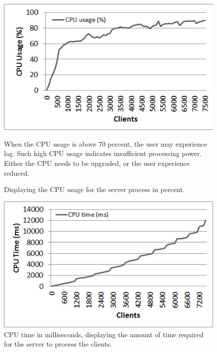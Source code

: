 \documentclass[bsc,frontabs,twoside,singlespacing,parskip,deptreport]{infthesis}     %
\begin{document}
\begin{center}
\begin{figure}
\centering
\label{fig:cpu_usage}
\includegraphics[scale=0.75]{images/test_CLIENT_CPUusage.jpg}
\caption{Displaying the CPU usage for the server process in percent.}
\vspace{1em}
When the CPU usage is above 70 percent, the user may experience lag. Such high CPU usage indicates insufficient processing power. Either the CPU needs to be upgraded, or the user experience reduced.
\end{figure}

\begin{figure}
\centering
\label{fig:cpu_time}
\includegraphics[scale=0.75]{images/test_CLIENT_CPUtime.jpg}
\caption{CPU time in milliseconds, displaying the amount of time required for the server to process the clients.}
\end{figure}


\end{center}
\end{document}
